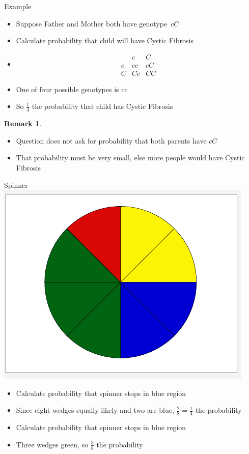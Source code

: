 \documentclass[handout]{beamer}
\theoremstyle{definition}
\newtheorem{remark}{Remark}
\begin{document}
\begin{frame}{Example}
\begin{itemize}
\item Suppose Father and Mother both have genotype~$cC$
\item Calculate probability that child will have Cystic Fibrosis
\item[]
\[\begin{array}{c|cc}
&c&C\\\hline
c&cc&cC\\
C&Cc&CC
\end{array}\]
\item One of four possible genotypes is $cc$
\item So $\frac{1}{4}$ the probability that child has Cystic Fibrosis
\end{itemize}
\begin{remark}
\begin{itemize}
\item Question does \alert{not} ask for probability that
both parents have $cC$
\item That probability must be very small, else more
people would have Cystic Fibrosis
\end{itemize}
\end{remark}
\end{frame}

\begin{frame}{Spinner}
\includegraphics[scale=.30]{Spinner}
\begin{itemize}
\item Calculate probability that spinner stops in blue region
\item Since eight wedges equally likely and two are blue,
$\frac{2}{8}=\frac{1}{4}$ the probability 
\item Calculate probability that spinner stops in blue region
\item Three wedges green, so $\frac{3}{8}$ the probability
\end{itemize}
\end{frame}
\end{document}
